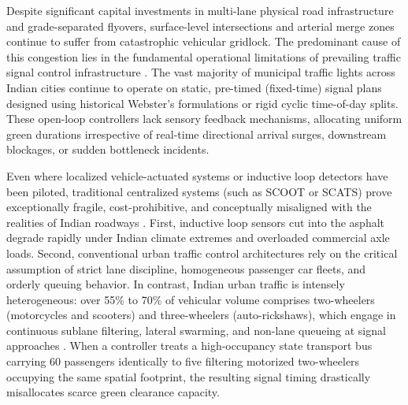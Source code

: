\documentclass[12pt,a4paper,oneside]{report}
\begin{document}
Despite significant capital investments in multi-lane physical road infrastructure and grade-separated flyovers, surface-level intersections and arterial merge zones continue to suffer from catastrophic vehicular gridlock. The predominant cause of this congestion lies in the fundamental operational limitations of prevailing traffic signal control infrastructure \cite{ref_roess2010}. The vast majority of municipal traffic lights across Indian cities continue to operate on static, pre-timed (fixed-time) signal plans designed using historical Webster's formulations or rigid cyclic time-of-day splits. These open-loop controllers lack sensory feedback mechanisms, allocating uniform green durations irrespective of real-time directional arrival surges, downstream blockages, or sudden bottleneck incidents. 

Even where localized vehicle-actuated systems or inductive loop detectors have been piloted, traditional centralized systems (such as SCOOT or SCATS) prove exceptionally fragile, cost-prohibitive, and conceptually misaligned with the realities of Indian roadways \cite{ref_scats1980}. First, inductive loop sensors cut into the asphalt degrade rapidly under Indian climate extremes and overloaded commercial axle loads. Second, conventional urban traffic control architectures rely on the critical assumption of strict lane discipline, homogeneous passenger car fleets, and orderly queuing behavior. In contrast, Indian urban traffic is intensely heterogeneous: over 55\% to 70\% of vehicular volume comprises two-wheelers (motorcycles and scooters) and three-wheelers (auto-rickshaws), which engage in continuous sublane filtering, lateral swarming, and non-lane queueing at signal approaches \cite{ref_pune_dataset, ref_iisc_bmd45}. When a controller treats a high-occupancy state transport bus carrying 60 passengers identically to five filtering motorized two-wheelers occupying the same spatial footprint, the resulting signal timing drastically misallocates scarce green clearance capacity.
\end{document}
